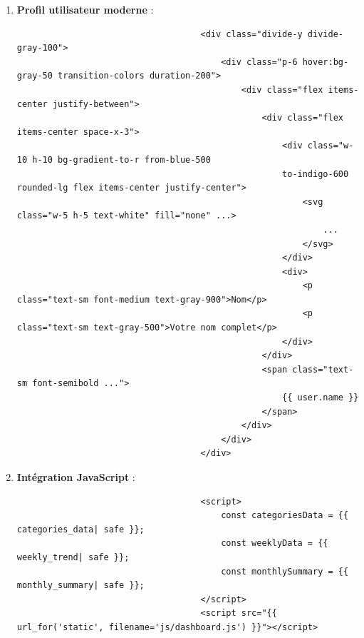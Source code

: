 \documentclass[a4paper,11pt]{article}
\begin{document}
\begin{enumerate}
                        \item \textbf{Profil utilisateur moderne} :
                            \begin{tcolorbox}[colback=lightgray!6, colframe=black, left=-70mm, right=5mm, top=2mm, bottom=0mm, boxrule=0.1mm]
                                \begin{verbatim}
                                    <div class="divide-y divide-gray-100">
                                        <div class="p-6 hover:bg-gray-50 transition-colors duration-200">
                                            <div class="flex items-center justify-between">
                                                <div class="flex items-center space-x-3">
                                                    <div class="w-10 h-10 bg-gradient-to-r from-blue-500 
                                                    to-indigo-600 rounded-lg flex items-center justify-center">
                                                        <svg class="w-5 h-5 text-white" fill="none" ...>
                                                            ...
                                                        </svg>
                                                    </div>
                                                    <div>
                                                        <p class="text-sm font-medium text-gray-900">Nom</p>
                                                        <p class="text-sm text-gray-500">Votre nom complet</p>
                                                    </div>
                                                </div>
                                                <span class="text-sm font-semibold ...">
                                                    {{ user.name }}
                                                </span>
                                            </div>
                                        </div>
                                    </div>
                                \end{verbatim}
                            \end{tcolorbox}

                        \item \textbf{Intégration JavaScript} :
                            \begin{tcolorbox}[colback=lightgray!6, colframe=black, left=-70mm, right=5mm, top=2mm, bottom=0mm, boxrule=0.1mm]
                                \begin{verbatim}
                                    <script>
                                        const categoriesData = {{ categories_data| safe }};
                                        const weeklyData = {{ weekly_trend| safe }};
                                        const monthlySummary = {{ monthly_summary| safe }};
                                    </script>
                                    <script src="{{ url_for('static', filename='js/dashboard.js') }}"></script>
                                \end{verbatim}
                            \end{tcolorbox}


\end{enumerate}
\end{document}
